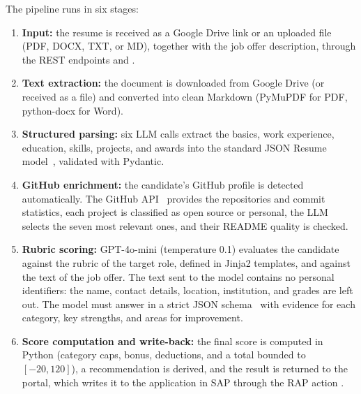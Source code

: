 The pipeline runs in six stages:

\begin{enumerate}
    \item \textbf{Input:} the resume is received as a Google Drive link or an uploaded file (PDF, DOCX, TXT, or MD), together with the job offer description, through the REST endpoints  and .
    \item \textbf{Text extraction:} the document is downloaded from Google Drive (or received as a file) and converted into clean Markdown (PyMuPDF for PDF, python-docx for Word).
    \item \textbf{Structured parsing:} six LLM calls extract the basics, work experience, education, skills, projects, and awards into the standard JSON Resume model~\cite{jsonresume}, validated with Pydantic.
    \item \textbf{GitHub enrichment:} the candidate's GitHub profile is detected automatically. The GitHub API~\cite{github_api} provides the repositories and commit statistics, each project is classified as open source or personal, the LLM selects the seven most relevant ones, and their README quality is checked.
    \item \textbf{Rubric scoring:} GPT-4o-mini (temperature 0.1) evaluates the candidate against the rubric of the target role, defined in Jinja2 templates, and against the text of the job offer. The text sent to the model contains no personal identifiers: the name, contact details, location, institution, and grades are left out. The model must answer in a strict JSON schema~\cite{openai_structured} with evidence for each category, key strengths, and areas for improvement.
    \item \textbf{Score computation and write-back:} the final score is computed in Python (category caps, bonus, deductions, and a total bounded to $[-20, 120]$), a recommendation is derived, and the result is returned to the portal, which writes it to the application in SAP through the RAP action .
\end{enumerate}

